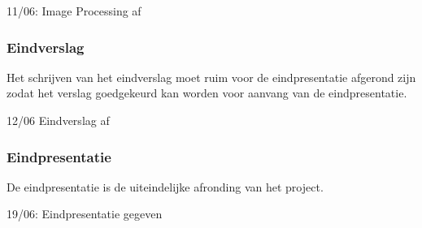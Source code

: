 11/06: Image Processing af

\subsubsection{Eindverslag}
Het schrijven van het eindverslag moet ruim voor de eindpresentatie afgerond
zijn zodat het verslag goedgekeurd kan worden voor aanvang van de eindpresentatie.

12/06 Eindverslag af

\subsubsection{Eindpresentatie}
De eindpresentatie is de uiteindelijke afronding van het project.

19/06: Eindpresentatie gegeven

